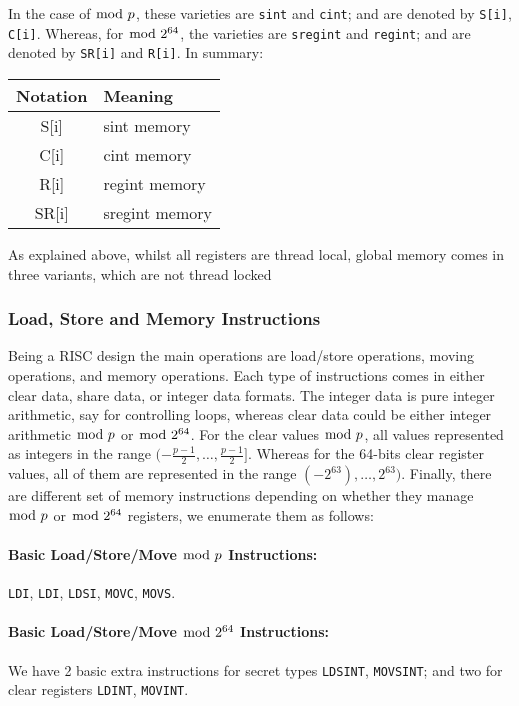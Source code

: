 In the case of $\bmod \; p$, these varieties are \verb+sint+ and \verb+cint+; and are denoted by \verb+S[i]+, \verb+C[i]+. Whereas, for $\bmod \; 2^{64}$, the varieties are \verb+sregint+ and
\verb+regint+; and are denoted by \verb+SR[i]+ and \verb+R[i]+.
In summary:
\begin{center}
\begin{tabular}{|c|l|}
\hline
Notation & Meaning \\
\hline
    S[i]  & sint memory \\
    C[i]  & cint memory \\
    R[i]  & regint memory \\
    SR[i] & sregint memory \\
\hline
\end{tabular}
\end{center}
As explained above, whilst all registers are thread local,
global memory comes in three variants, which are not thread locked

\subsubsection{Load, Store and Memory Instructions}
Being a RISC design the main operations are load/store
operations, moving operations, and memory operations.
Each type of instructions comes in either clear data,
share data, or integer data formats.
The integer data is pure integer arithmetic, say
for controlling loops, whereas clear data could be either integer
arithmetic $\bmod \; p$ or $\bmod \; 2^{64}$.
For the clear values  $\bmod \; p$, all values represented as integers
in the range $(-\frac{p-1}{2}, \dots, \frac{p-1}{2}]$.
Whereas for the 64-bits clear register values, all of them are represented
in the range $(-2^{63}), \dots, 2^{63})$.
Finally, there are different set of memory instructions depending on whether they manage $\bmod \; p$ or $\bmod \; 2^{64}$ registers, we enumerate them as follows:

\paragraph{Basic Load/Store/Move  $\bmod \; p$ Instructions:}
\verb+LDI+,
\verb+LDI+,
\verb+LDSI+,
\verb+MOVC+,
\verb+MOVS+.


\paragraph{Basic Load/Store/Move $\bmod \; 2^{64}$ Instructions:}
We have 2 basic extra instructions for secret types \verb+LDSINT+,
\verb+MOVSINT+; and two for clear registers \verb+LDINT+, \verb+MOVINT+.

